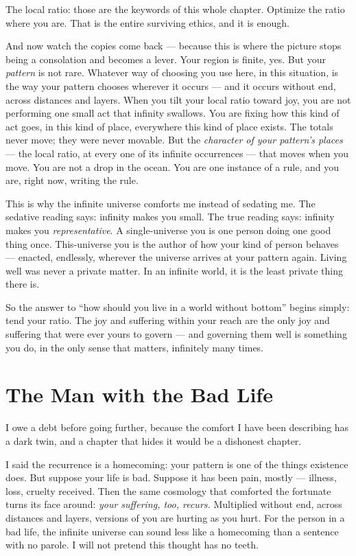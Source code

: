 \documentclass[fontsize=11pt,paper=a4,pagesize=auto,parskip=half-]{scrbook}
\begin{document}
The local ratio: those are the keywords of this whole chapter. Optimize the ratio where you are. That is the entire surviving ethics, and it is enough.

And now watch the copies come back --- because this is where the picture stops being a consolation and becomes a lever. Your region is finite, yes. But your \emph{pattern} is not rare. Whatever way of choosing you use here, in this situation, is the way your pattern chooses wherever it occurs --- and it occurs without end, across distances and layers. When you tilt your local ratio toward joy, you are not performing one small act that infinity swallows. You are fixing how this kind of act goes, in this kind of place, everywhere this kind of place exists. The totals never move; they were never movable. But the \emph{character of your pattern's places} --- the local ratio, at every one of its infinite occurrences --- that moves when you move. You are not a drop in the ocean. You are one instance of a rule, and you are, right now, writing the rule.

This is why the infinite universe comforts me instead of sedating me. The sedative reading says: infinity makes you small. The true reading says: infinity makes you \emph{representative}. A single-universe you is one person doing one good thing once. This-universe you is the author of how your kind of person behaves --- enacted, endlessly, wherever the universe arrives at your pattern again. Living well was never a private matter. In an infinite world, it is the least private thing there is.

So the answer to ``how should you live in a world without bottom'' begins simply: tend your ratio. The joy and suffering within your reach are the only joy and suffering that were ever yours to govern --- and governing them well is something you do, in the only sense that matters, infinitely many times.

\section{The Man with the Bad Life}

I owe a debt before going further, because the comfort I have been describing has a dark twin, and a chapter that hides it would be a dishonest chapter.

I said the recurrence is a homecoming: your pattern is one of the things existence does. But suppose your life is bad. Suppose it has been pain, mostly --- illness, loss, cruelty received. Then the same cosmology that comforted the fortunate turns its face around: \emph{your suffering, too, recurs.} Multiplied without end, across distances and layers, versions of you are hurting as you hurt. For the person in a bad life, the infinite universe can sound less like a homecoming than a sentence with no parole. I will not pretend this thought has no teeth.
\end{document}
